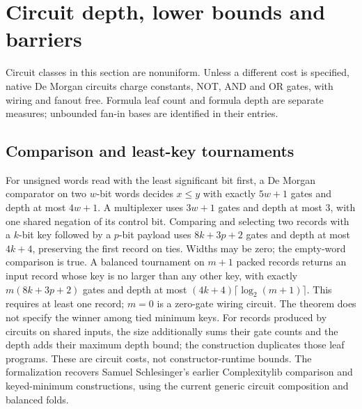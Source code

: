 \section{Circuit depth, lower bounds and barriers}

Circuit classes in this section are nonuniform. Unless a different cost is
specified, native De Morgan circuits charge constants, NOT, AND and OR gates,
with wiring and fanout free. Formula leaf count and formula depth are separate
measures; unbounded fan-in bases are identified in their entries.

\begin{result}
\subsection{Comparison and least-key tournaments}
For unsigned words read with the least significant bit first, a De Morgan
comparator on two $w$-bit words decides $x\le y$ with exactly $5w+1$ gates
and depth at most $4w+1$. A multiplexer uses $3w+1$ gates and depth at most
$3$, with one shared negation of its control bit. Comparing and selecting
two records with a $k$-bit key followed by a $p$-bit payload uses
$8k+3p+2$ gates and depth at most $4k+4$, preserving the first record on ties.
Widths may be zero; the empty-word comparison is true.
A balanced tournament on $m+1$ packed records returns an input record whose
key is no larger than any other key, with exactly $m(8k+3p+2)$ gates and depth
at most $(4k+4)\lceil\log_2(m+1)\rceil$. This requires at least one record;
$m=0$ is a zero-gate wiring circuit. The theorem does not specify the winner
among tied minimum keys. For records produced by circuits on shared inputs,
the size additionally sums their gate counts and the depth adds their maximum
depth bound; the construction duplicates those leaf programs.
These are circuit costs, not constructor-runtime bounds. The formalization
recovers Samuel Schlesinger's earlier Complexitylib comparison and keyed-minimum
constructions, using the current generic circuit composition and balanced folds.

\end{result}
